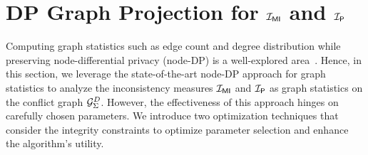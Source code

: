 \section{DP Graph Projection for $\mathcal{I_{\mathsf{MI}}}$ and $\mathcal{I_\mathsf{P}}$}\label{sec:graph-algorithms-graphproj}


Computing graph statistics such as edge count and degree distribution while preserving node-differential privacy (node-DP) is a well-explored area~\cite{day2016publishing, KasiviswanathanNRS13, blocki2013differentially}. 
Hence, in this section, we leverage the state-of-the-art node-DP approach for graph statistics to analyze the inconsistency measures $\mathcal{I_{\mathsf{MI}}}$ and $\mathcal{I_\mathsf{P}}$ as graph statistics on the conflict graph ${\mathcal{G}_{{\Sigma}}^{D}}$. However, the effectiveness of this approach hinges on carefully chosen parameters.  We introduce two optimization techniques that consider the integrity constraints to optimize parameter selection and enhance the algorithm's utility.





